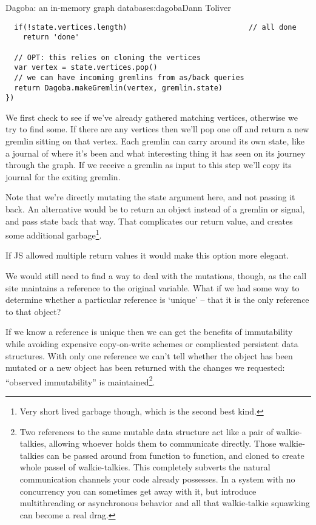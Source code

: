 \begin{aosachapter}{Dagoba: an in-memory graph database}{s:dagoba}{Dann Toliver}
\begin{verbatim}
  if(!state.vertices.length)                            // all done
    return 'done'
  
  // OPT: this relies on cloning the vertices
  var vertex = state.vertices.pop()                     
  // we can have incoming gremlins from as/back queries
  return Dagoba.makeGremlin(vertex, gremlin.state)      
})
\end{verbatim}

We first check to see if we've already gathered matching vertices,
otherwise we try to find some. If there are any vertices then we'll pop
one off and return a new gremlin sitting on that vertex. Each gremlin
can carry around its own state, like a journal of where it's been and
what interesting thing it has seen on its journey through the graph. If
we receive a gremlin as input to this step we'll copy its journal for
the exiting gremlin.

Note that we're directly mutating the state argument here, and not
passing it back. An alternative would be to return an object instead of
a gremlin or signal, and pass state back that way. That complicates our
return value, and creates some additional garbage\footnote{Very short
  lived garbage though, which is the second best kind.}.

If JS allowed multiple return values it would make this option more
elegant.

We would still need to find a way to deal with the mutations, though, as
the call site maintains a reference to the original variable. What if we
had some way to determine whether a particular reference is `unique' --
that it is the only reference to that object?

If we know a reference is unique then we can get the benefits of
immutability while avoiding expensive copy-on-write schemes or
complicated persistent data structures. With only one reference we can't
tell whether the object has been mutated or a new object has been
returned with the changes we requested: ``observed immutability'' is
maintained\footnote{Two references to the same mutable data structure
  act like a pair of walkie-talkies, allowing whoever holds them to
  communicate directly. Those walkie-talkies can be passed around from
  function to function, and cloned to create whole passel of
  walkie-talkies. This completely subverts the natural communication
  channels your code already possesses. In a system with no concurrency
  you can sometimes get away with it, but introduce multithreading or
  asynchronous behavior and all that walkie-talkie squawking can become
  a real drag.}.


\end{aosachapter}
